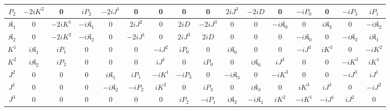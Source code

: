 \documentclass[journal,article,submit,pdftex,moreauthors]{Definitions/mdpi}
\begin{document}
\begin{minipage}[t]{.49\textwidth}
{\begin{tabular}{ |c||c|c|c|c|c|c|c|c|c|c|c|c|c|c|c| }
 \hline 
 \rule{0pt}{16pt} $P_{{2}}$ &$-2i{K}^{{2}}$&0&$iP_{{2}}$&${-2i{J}^{{1}}}$&0&0&0&0&$2iJ^{{3}}$&$-2iD$&0&$-iP_{{0}}$&0&${-iP_{{3}}}$&$iP_{{1}}$\\
 \hline 
 \rule{0pt}{16pt} $\mathfrak{K}_{{1}}$ &0&$-2i{K}^{{1}}$&$-i\mathfrak{K}_{{1}}$&0&${2i{J}^{{2}}}$&0&$2iD$&$-2iJ^{{3}}$&0&0&$-i\mathfrak{K}_{{0}}$&0&${i\mathfrak{K}_{{3}}}$&0&$-i\mathfrak{K}_{{2}}$\\
 \hline 
 \rule{0pt}{16pt} $\mathfrak{K}_{{2}}$ &0&$-2i{K}^{{2}}$&$-i\mathfrak{K}_{{2}}$&0&${-2i{J}^{{1}}}$&0&$2iJ^{{3}}$&$2iD$&0&0&0&$-i\mathfrak{K}_{{0}}$&0&${-i\mathfrak{K}_{{3}}}$&$i\mathfrak{K}_{{1}}$\\
 \hline 
 \rule{0pt}{16pt} ${K}^{{1}}$ &$i\mathfrak{K}_{{1}}$&$iP_{{1}}$&0&0&0&$-i{J}^{{2}}$&$iP_{{0}}$&0&$i\mathfrak{K}_{{0}}$&0&0&$-iJ^{{3}}$&${iK^{{3}}}$&0&$-i{K}^{{2}}$\\
 \hline 
 \rule{0pt}{16pt} ${K}^{{2}}$ &$i\mathfrak{K}_{{2}}$&$iP_{{2}}$&0&0&0&$i{J}^{{1}}$&0&$iP_{{0}}$&0&$i\mathfrak{K}_{{0}}$&$iJ^{{3}}$&0&0&${-iK^{{3}}}$&$i{K}^{{1}}$\\
 \hline 
 \rule{0pt}{16pt} ${J}^{{2}}$ &0&0&0&${i\mathfrak{K}_{{1}}}$&${iP_{{1}}}$&$-i{K}^{{1}}$&$-iP_{{3}}$&0&${-i\mathfrak{K}_{{3}}}$&0&$-iK^{{3}}$&0&0&$-iJ^{{3}}$&$i{J}^{{1}}$\\
 \hline 
 \rule{0pt}{16pt} ${J}^{{1}}$ &0&0&0&${-i\mathfrak{K}_{{2}}}$&${-iP_{{2}}}$&$i{K}^{{2}}$&0&$iP_{{3}}$&0&${i\mathfrak{K}_{{3}}}$&0&$iK^{{3}}$&$iJ^{{3}}$&0&$-i{J}^{{2}}$\\
 \hline 
 \rule{0pt}{16pt} $J^{{3}}$ &0&0&0&0&0&0&$iP_{{2}}$&$-iP_{{1}}$&$i\mathfrak{K}_{{2}}$&$-i\mathfrak{K}_{{1}}$&$i{K}^{{2}}$&$-i{K}^{{1}}$&$-i{J}^{{1}}$&$i{J}^{{2}}$&0\\
 \hline 
\end{tabular}}
\label{tabelIFD}
\end{minipage}\hfill
\end{document}
